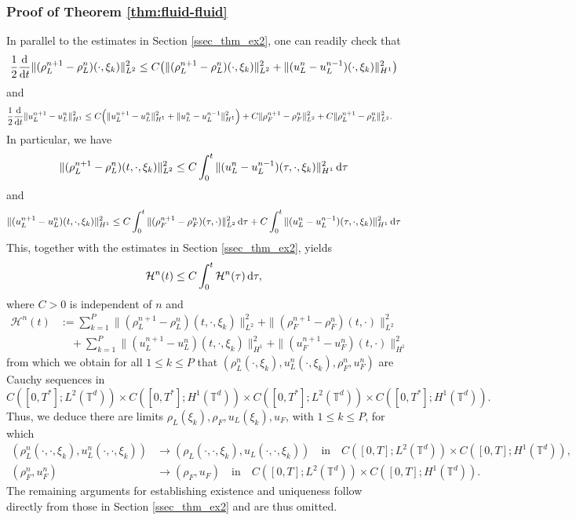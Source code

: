 \documentclass[10pt, reqno]{amsart}
\theoremstyle{definition}
\theoremstyle{remark}
\numberwithin{equation}{section}
\newcommand{\dtau}{\textnormal{d}\tau}
\newcommand{\ddt}{\frac{\textnormal{d}}{\textnormal{d}t}}
\newcommand{\calH}{\mathcal H}
\newcommand{\T}{\mathbb{T}}
\begin{document}
\subsubsection{Proof of Theorem \ref{thm:fluid-fluid}} In parallel to the estimates in Section \ref{ssec_thm_ex2}, one can readily check that 
\begin{align*}
    \frac{1}{2}\ddt \|(\rho_L^{n+1}-\rho_L^n)(\cdot,\xi_k)\|_{L^2}^2 \le C\big(\|(\rho_L^{n+1}-\rho_L^n)(\cdot,\xi_k)\|_{L^2}^2 + \|(u_L^n - u_L^{n-1})( \cdot, \xi_k)\|_{H^1}^2\big)
\end{align*}
and
\begin{align*}
    &\frac{1}{2}\ddt \|u_L^{n+1} - u_L^n\|_{H^1}^2   \le C \Big(\|u_L^{n+1} - u_L^n\|_{H^1}^2 + \|u_L^n - u_L^{n-1}\|_{H^1}^2 \Big)  + C\|\rho_F^{n+1}-\rho_F^n\|_{L^2}^2 + C \|\rho_L^{n+1} - \rho_L^n\|_{L^2}^2.
\end{align*}
In particular, we have
\[
\|(\rho_L^{n+1}-\rho_L^n)(t,\cdot,\xi_k)\|_{L^2}^2 \leq C\int_0^t \|(u_L^n - u_L^{n-1})(\tau, \cdot, \xi_k)\|_{H^1}^2\, \dtau
\]
and
\[
\|(u_L^{n+1} - u_L^n)(t,\cdot, \xi_k)\|_{H^1}^2 \leq C\int_0^t \|(\rho_F^{n+1} - \rho_F^n)(\tau,\cdot)\|_{L^2}^2\,\dtau + C\int_0^t \|(u_L^n - u_L^{n-1})(\tau, \cdot, \xi_k)\|_{H^1}^2\, \dtau
\]
This, together with the estimates in Section \ref{ssec_thm_ex2}, yields
\[
    \calH^n(t) \leq C \int_0^t     \calH^n(\tau)\,\dtau,
\]
where $C>0$ is independent of $n$ and 
\begin{align*}
    \calH^n(t) &:= \sum_{k=1}^P \|(\rho_L^{n+1} - \rho_L^n)(t,\cdot,\xi_k)\|_{L^2}^2 + \|(\rho_F^{n+1}-\rho_F^n)(t,\cdot)\|_{L^2}^2 \\
    &\quad + \sum_{k=1}^P \|(u_L^{n+1}- u_L^n)(t,\cdot,\xi_k)\|_{H^1}^2 + \|(u_F^{n+1} - u_F^n)(t,\cdot)\|_{H^1}^2 
\end{align*}
from which we obtain for all $1\le k \le P$ that $(\rho_L^n(\cdot,\xi_k), u_L^n(\cdot,\xi_k), \rho_F^n, u_F^n )$ are Cauchy sequences in 
\[
C([0,T^*];L^2(\T^d)) \times C([0,T^*];H^1(\T^d)) \times C([0,T^*];L^2(\T^d)) \times C([0,T^*];H^1(\T^d)).
\]
Thus, we deduce there are limits $\rho_L(\xi_k), \rho_F, u_L(\xi_k), u_F$, with $1\le k \le P$, for which
\begin{equation*}
\begin{split}
 (\rho_L^n(\cdot,\cdot,\xi_k), u_L^n(\cdot,\cdot,\xi_k)) &\to (\rho_L(\cdot,\cdot,\xi_k), u_L(\cdot,\cdot,\xi_k)) \quad \text{in} \quad C([0,T];L^2(\T^d)) \times C([0,T]; H^1(\T^d)),\\
(\rho_F^n, u_F^n) &\to (\rho_F, u_F) \quad \text{in} \quad C([0,T];L^2(\T^d)) \times  C([0,T];H^1(\T^d)).
\end{split}
\end{equation*}
The remaining arguments for establishing existence and uniqueness follow directly from those in Section \ref{ssec_thm_ex2} and are thus omitted.
\end{document}

